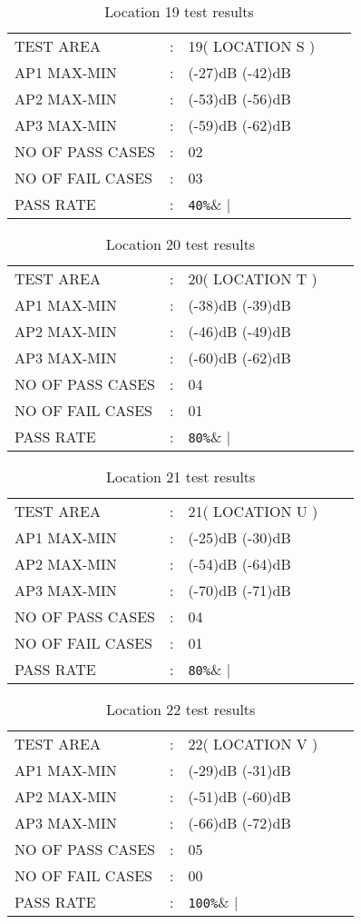 \documentclass{report}
\begin{document}
\begin{table}[H]
	\centering
	\label{LOCATION NINETEEN TEST}
	\begin{tabular}{lllll}
		TEST AREA& :&  19( LOCATION S )&    \\
		AP1 MAX-MIN& :& (-27)dB (-42)dB&  \\
		AP2 MAX-MIN& :& (-53)dB (-56)dB&   \\
		AP3 MAX-MIN& :& (-59)dB (-62)dB&   \\
		NO OF PASS CASES& :& 02&  \\
		NO OF FAIL CASES& :& 03&   \\
		PASS RATE& :& \verb|40%|&   
	\end{tabular}
	\caption{Location 19 test results}
\end{table}

\begin{table}[H]
	\centering
	\label{LOCATION TWENTY TEST}
	\begin{tabular}{lllll}
		TEST AREA& :&  20( LOCATION T )&    \\
		AP1 MAX-MIN& :& (-38)dB (-39)dB&  \\
		AP2 MAX-MIN& :& (-46)dB (-49)dB&   \\
		AP3 MAX-MIN& :& (-60)dB (-62)dB&   \\
		NO OF PASS CASES& :& 04&  \\
		NO OF FAIL CASES& :& 01&   \\
		PASS RATE& :& \verb|80%|&   
	\end{tabular}
	\caption{Location 20 test results}
\end{table}

\begin{table}[H]
	\centering
	\label{LOCATION TWENTY ONE TEST}
	\begin{tabular}{lllll}
		TEST AREA& :&  21( LOCATION U )&    \\
		AP1 MAX-MIN& :& (-25)dB (-30)dB&  \\
		AP2 MAX-MIN& :& (-54)dB (-64)dB&   \\
		AP3 MAX-MIN& :& (-70)dB (-71)dB&   \\
		NO OF PASS CASES& :& 04&  \\
		NO OF FAIL CASES& :& 01&   \\
		PASS RATE& :& \verb|80%|&   
	\end{tabular}
	\caption{Location 21 test results}
\end{table}

\begin{table}[H]
	\centering
	\label{LOCATION TWENTY TWO TEST}
	\begin{tabular}{lllll}
		TEST AREA& :&  22( LOCATION V )&    \\
		AP1 MAX-MIN& :& (-29)dB (-31)dB&  \\
		AP2 MAX-MIN& :& (-51)dB (-60)dB&   \\
		AP3 MAX-MIN& :& (-66)dB (-72)dB&   \\
		NO OF PASS CASES& :& 05&  \\
		NO OF FAIL CASES& :& 00&   \\
		PASS RATE& :& \verb|100%|&   
	\end{tabular}
	\caption{Location 22 test results}
\end{table}
\end{document}
